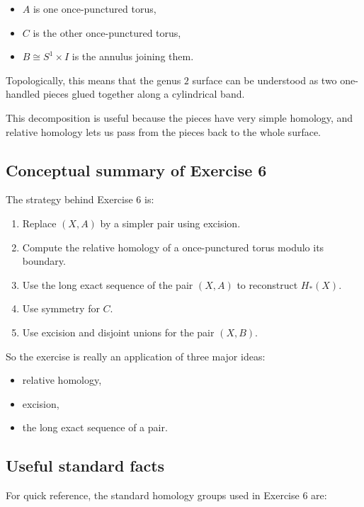 \documentclass[12pt,a4paper]{article}
\theoremstyle{notespace}
\begin{document}
\begin{itemize}
	\item \(A\) is one once-punctured torus,
	\item \(C\) is the other once-punctured torus,
	\item \(B\cong S^1\times I\) is the annulus joining them.
\end{itemize}

Topologically, this means that the genus \(2\) surface can be understood as two one-handled pieces glued together along a cylindrical band.

This decomposition is useful because the pieces have very simple homology, and relative homology lets us pass from the pieces back to the whole surface.

\subsection{Conceptual summary of Exercise 6}

The strategy behind Exercise 6 is:

\begin{enumerate}
	\item Replace \((X,A)\) by a simpler pair using excision.
	\item Compute the relative homology of a once-punctured torus modulo its boundary.
	\item Use the long exact sequence of the pair \((X,A)\) to reconstruct \(H_*(X)\).
	\item Use symmetry for \(C\).
	\item Use excision and disjoint unions for the pair \((X,B)\).
\end{enumerate}

So the exercise is really an application of three major ideas:

\begin{itemize}
	\item relative homology,
	\item excision,
	\item the long exact sequence of a pair.
\end{itemize}

\subsection{Useful standard facts}

For quick reference, the standard homology groups used in Exercise 6 are:
\end{document}
